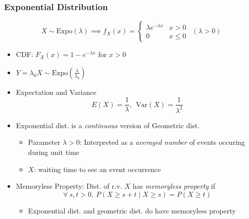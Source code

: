 \subsubsection*{Exponential Distribution}
\begin{equation}
    X\sim\text{Expo}(\lambda)\implies f_X(x)=\begin{cases}
        \lambda e^{-\lambda x} & x>0 \\
        0 & x\leq 0
    \end{cases}~~(\lambda>0)
\end{equation}
\begin{itemize}
    \item CDF: $F_X(x)=1-e^{-\lambda x}$ for $x>0$
    \item $Y=\lambda_0X\sim\text{Expo}\left(\frac{\lambda}{\lambda_0}\right)$
    \item Expectation and Variance
    \begin{equation}
        E(X)=\frac{1}{\lambda},~~\text{Var}(X)=\frac{1}{\lambda^2}
    \end{equation}
    \item Exponential dist. is a \textit{continuous} version of Geometric dist.
    \begin{itemize}
        \item Parameter $\lambda>0$: Interpreted as a \textit{averaged number} of events occuring during unit time
        \item $X$: waiting time to see an event occurrence
    \end{itemize}
    \item Memoryless Property: Dist. of r.v. $X$ has \textit{memoryless property} if
    \begin{equation}
        \forall~s,t>0,~P(X\geq s+t\mid X\geq s)=P(X\geq t)
    \end{equation}
    \begin{itemize}
        \item Exponential dist. and geometric dist. do have memoryless property
    \end{itemize}
\end{itemize}
